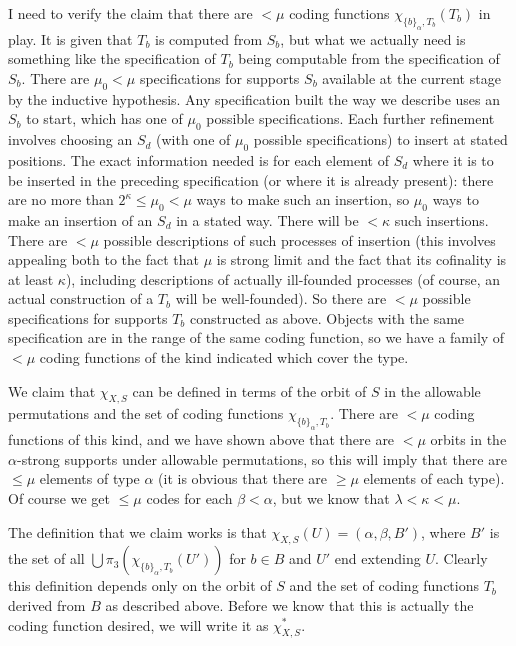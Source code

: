 \documentclass[112pt]{article}
\begin{document}
\begin{description}
I need to verify the claim that there are $<\mu$ coding functions $\chi_{\{b\}_\alpha,T_b}(T_b)$ in play.  It is given that $T_b$ is computed from
$S_b$, but what we actually need is something like the specification of $T_b$ being computable from the specification of $S_b$.  There are $\mu_0<\mu$ specifications for supports $S_b$ available at the current stage by the inductive hypothesis.   Any specification built the way we describe uses
an $S_b$ to start, which has one of $\mu_0$ possible specifications.  Each further refinement involves choosing an $S_d$ (with one of $\mu_0$ possible specifications) to insert 
at stated positions.  The exact information needed is for each element of $S_d$ where it is to be inserted in the preceding specification (or where it is already present):  there are no more than $2^\kappa\leq \mu_0<\mu$ ways to make such an insertion, so $\mu_0$ ways to make an insertion of an $S_d$ in a stated way. There will be $<\kappa$ such insertions.
There are $<\mu$ possible descriptions of such processes of insertion (this involves appealing both to the fact that $\mu$ is strong limit and the fact that its cofinality is at least $\kappa$), including descriptions of actually ill-founded processes (of course, an actual construction of a $T_b$ will be well-founded).  So there are $<\mu$ possible specifications for supports $T_b$ constructed as above.   Objects with the same specification are in the range of the same coding function, so we have a family of $<\mu$ coding functions of the kind indicated which cover the type.

We claim that $\chi_{X,S}$ can be defined in terms of the orbit of $S$ in the allowable permutations and the set of coding functions $\chi_{\{b\}_\alpha,T_b}$.  There are $<\mu$ coding functions of this kind, and we have shown above that there are $<\mu$ orbits in the $\alpha$-strong supports under allowable permutations, so this will imply that there are $\leq \mu$ elements of type $\alpha$ (it is obvious that there are $\geq \mu$ elements of each type).
Of course we get $\leq \mu$ codes for each $\beta<\alpha$, but we know that $\lambda<\kappa<\mu$.

The definition that we claim works is that $\chi_{X,S}(U) = (\alpha,\beta,B')$, where $B'$ is the set of all $\bigcup \pi_3(\chi_{\{b\}_\alpha,T_b}(U'))$ for $b \in B$ and $U'$ end extending $U$.  Clearly this definition depends only on the orbit of $S$ and the set of coding functions $T_b$ derived from $B$ as described above.  Before we know that this is actually the coding function desired, we will write it as $\chi_{X,S}^*$.


\end{description}
\end{document}
